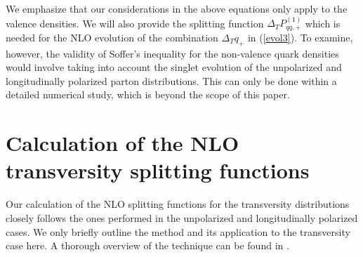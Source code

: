 We emphasize that our considerations in the above equations only
apply to the valence densities. We will also provide the splitting
function $\Delta_T P_{qq,+}^{(1)}$ which is needed for the NLO
evolution of the combination $\Delta_T q_+$ in (\ref{evol3}). To examine, 
however, the validity of Soffer's inequality for the non-valence quark 
densities would involve taking into account the singlet evolution of the 
unpolarized and longitudinally polarized parton distributions. This can only 
be done within a detailed numerical study, which is beyond the scope of this 
paper. 
%
\section{Calculation of the NLO transversity splitting functions}
%
\newcommand{\slsh}{\rlap{$\;\!\!\not$}}     %
\def\Proj{\Delta_T {\cal P}}
Our calculation of the NLO splitting functions for the transversity
distributions closely follows the ones performed in the unpolarized 
\cite{cfp,fp,ev} and longitudinally polarized \cite{wv} cases.
We only briefly outline the method and its application to the transversity
case here. A thorough overview of the technique can be found in 
\cite{cfp,ev}.  

